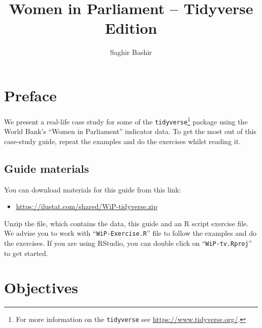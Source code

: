 \documentclass[a4paper,9pt,twocolumn,twoside,printwatermark=false]{pinp}
\title{Women in Parliament -- Tidyverse Edition}
\author[]{Saghir Bashir}
\providecommand{\tightlist}{%
  \setlength{\itemsep}{0pt}\setlength{\parskip}{0pt}}
\begin{document}
\verticaladjustment{-2pt}

\maketitle
\thispagestyle{firststyle}



\section{Preface}\label{preface}

We present a real-life case study for some of the
\texttt{tidyverse}\footnote{For more information on the
  \texttt{tidyverse} see \url{https://www.tidyverse.org/}.} package
using the World Bank's ``Women in Parliament'' indicator data. To get
the most out of this case-study guide, repeat the examples and do the
exercises whilst reading it.

\subsection{Guide materials}\label{guide-materials}

You can download materials for this guide from this link:

\begin{itemize}
\tightlist
\item
  \url{https://ilustat.com/shared/WiP-tidyverse.zip}
\end{itemize}

Unzip the file, which contains the data, this guide and an R script
exercise file. We advise you to work with ``\texttt{WiP-Exercise.R}''
file to follow the examples and do the exercises. If you are using
RStudio, you can double click on ``\texttt{WiP-tv.Rproj}'' to get
started.

\section{Objectives}\label{objectives}
\end{document}
